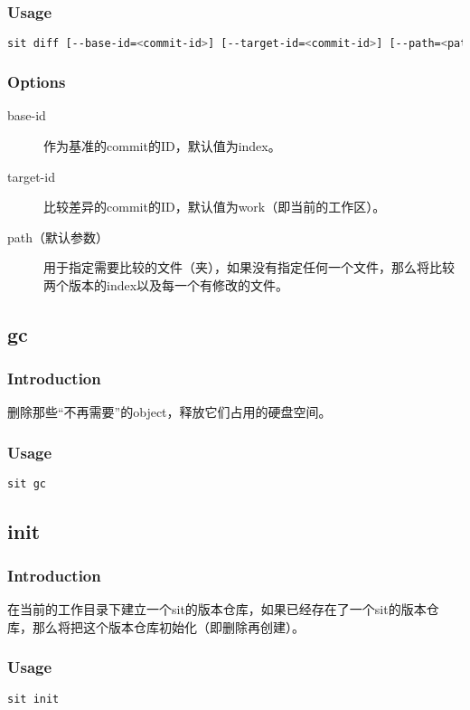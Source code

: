\documentclass[11pt, a4paper, UTF8]{ctexart}
\begin{document}
\subsubsection{Usage}
\begin{lstlisting}[language=sh,basicstyle=\small\YaHeiMono,numbers=none]
sit diff [--base-id=<commit-id>] [--target-id=<commit-id>] [--path=<path> ...]
\end{lstlisting}
\subsubsection{Options}
\begin{description}
	\item[\YaHeiMono base-id] 作为基准的commit的ID，默认值为index。
	\item[\YaHeiMono target-id] 比较差异的commit的ID，默认值为work（即当前的工作区）。
	\item[\YaHeiMono path（默认参数）] 用于指定需要比较的文件（夹），如果没有指定任何一个文件，那么将比较两个版本的index以及每一个有修改的文件。
\end{description}

\subsection{gc}
\subsubsection{Introduction}
删除那些``不再需要''的object，释放它们占用的硬盘空间。
\subsubsection{Usage}
\begin{lstlisting}[language=sh,basicstyle=\small\YaHeiMono,numbers=none]
sit gc
\end{lstlisting}

\subsection{init}
\subsubsection{Introduction}
在当前的工作目录下建立一个sit的版本仓库，如果已经存在了一个sit的版本仓库，那么将把这个版本仓库初始化（即删除再创建）。
\subsubsection{Usage}
\begin{lstlisting}[language=sh,basicstyle=\small\YaHeiMono,numbers=none]
sit init
\end{lstlisting}
\end{document}
